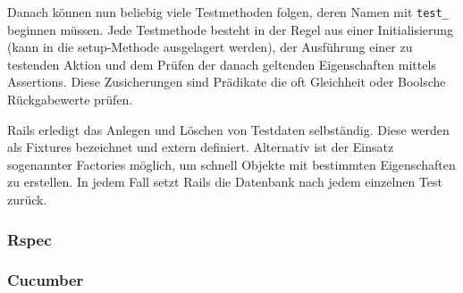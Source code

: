 Danach können nun beliebig viele Testmethoden folgen, deren Namen mit \texttt{test\_} beginnen müssen.
Jede Testmethode besteht in der Regel aus einer Initialisierung (kann in die setup-Methode ausgelagert werden), der Ausführung einer zu testenden Aktion und dem Prüfen der danach geltenden Eigenschaften mittels Assertions. Diese Zusicherungen sind Prädikate die oft Gleichheit oder Boolsche Rückgabewerte prüfen.


Rails erledigt das Anlegen und Löschen von Testdaten selbständig. Diese werden als Fixtures bezeichnet und extern definiert. Alternativ ist der Einsatz sogenannter Factories möglich, um schnell Objekte mit bestimmten Eigenschaften zu erstellen. In jedem Fall setzt Rails die Datenbank nach jedem einzelnen Test zurück.


\subsubsection{Rspec}
\subsubsection{Cucumber}